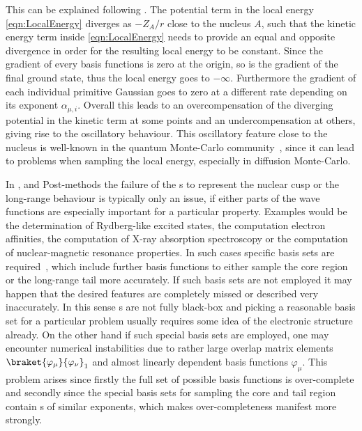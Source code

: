 This can be explained following \cite{Ma2005}.
The potential term in the local energy \eqref{eqn:LocalEnergy} diverges
as $-Z_A/r$ close to the nucleus $A$,
such that the kinetic energy term inside \eqref{eqn:LocalEnergy}
needs to provide an equal and opposite
divergence in order for the resulting local energy to be constant.
Since the gradient of every {\cGTO} basis functions is zero at the origin,
so is the gradient of the final \HF ground state,
thus the local energy goes to $-\infty$.
Furthermore the gradient of each individual primitive Gaussian
goes to zero at a different rate
depending on its exponent $\alpha_{\mu,i}$.
Overall this leads to an overcompensation
of the diverging potential in the kinetic term at some points
and an undercompensation at others,
giving rise to the oscillatory behaviour.
This oscillatory feature close to the nucleus is well-known
in the quantum Monte-Carlo community~\cite{Foulkes2001,Ma2005},
since it can lead to problems when sampling the local energy,
especially in diffusion Monte-Carlo.

In \HF, \DFT and Post-\HF methods
the failure of the {\cGTO}s to represent the nuclear cusp
or the long-range behaviour is typically only an issue,
if either parts of the wave functions are especially important
for a particular property.
Examples would be the determination of Rydberg-like excited states,
the computation electron affinities,
the computation of X-ray absorption spectroscopy
or the computation of nuclear-magnetic resonance properties.
In such cases specific basis sets
are required~\cite{Hill2013,Jensen2013},
which include further \cGTO basis functions
to either sample the core region or the long-range tail more accurately.
If such basis sets are not employed
it may happen that the desired features are completely missed or described very inaccurately.
In this sense {\cGTO}s are not fully black-box and
picking a reasonable basis set for a particular problem
usually requires some idea of the electronic structure already.
On the other hand if such special basis sets are employed,
one may encounter numerical instabilities
due to rather large overlap matrix elements $\braket{\varphi_\mu}{\varphi_\nu}_1$
and almost linearly dependent basis functions $\varphi_\mu$.
This problem arises
since firstly
the full set of possible \cGTO basis functions is over-complete
and secondly
since the special basis sets for sampling the core and tail region
contain {\cGTO}s of similar exponents,
which makes over-completeness manifest more strongly.

